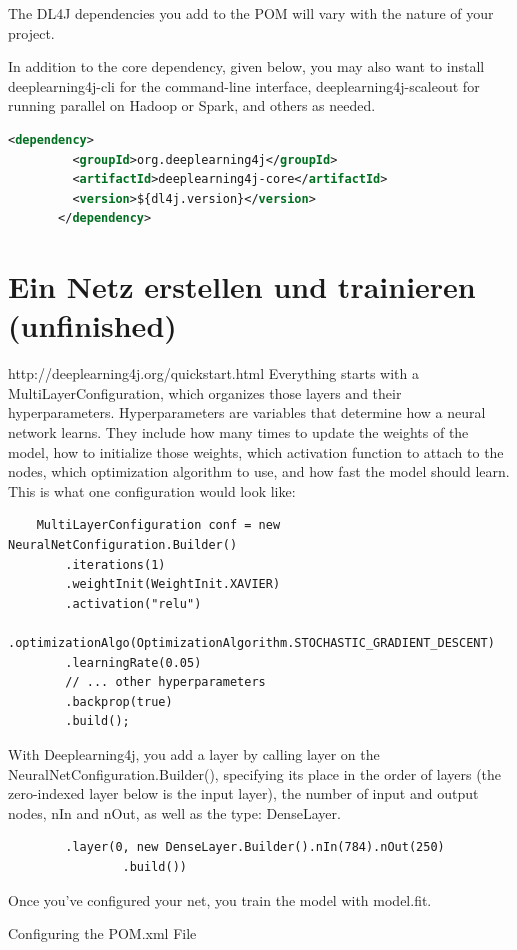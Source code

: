 {The DL4J dependencies you add to the POM will vary with the nature of your project.

In addition to the core dependency, given below, you may also want to install deeplearning4j-cli for the command-line interface, deeplearning4j-scaleout for running parallel on Hadoop or Spark, and others as needed.
\begin{lstlisting}[language=XML,caption=applicationContext.xml]
	   <dependency>
	     <groupId>org.deeplearning4j</groupId>
	     <artifactId>deeplearning4j-core</artifactId>
	     <version>${dl4j.version}</version>
	   </dependency>
\end{lstlisting}






\section{Ein Netz erstellen und trainieren (unfinished)}
http://deeplearning4j.org/quickstart.html
Everything starts with a MultiLayerConfiguration, which organizes those layers and their hyperparameters.
Hyperparameters are variables that determine how a neural network learns. They include how many times to update the weights of the model, how to initialize those weights, which activation function to attach to the nodes, which optimization algorithm to use, and how fast the model should learn. This is what one configuration would look like:
\begin{lstlisting}
    MultiLayerConfiguration conf = new NeuralNetConfiguration.Builder()
        .iterations(1)
        .weightInit(WeightInit.XAVIER)
        .activation("relu")
        .optimizationAlgo(OptimizationAlgorithm.STOCHASTIC_GRADIENT_DESCENT)
        .learningRate(0.05)
        // ... other hyperparameters
        .backprop(true)
        .build();
\end{lstlisting}
With Deeplearning4j, you add a layer by calling layer on the NeuralNetConfiguration.Builder(), specifying its place in the order of layers (the zero-indexed layer below is the input layer), the number of input and output nodes, nIn and nOut, as well as the type: DenseLayer.
\begin{lstlisting}
        .layer(0, new DenseLayer.Builder().nIn(784).nOut(250)
                .build())
\end{lstlisting}
Once you’ve configured your net, you train the model with model.fit.

Configuring the POM.xml File

}
